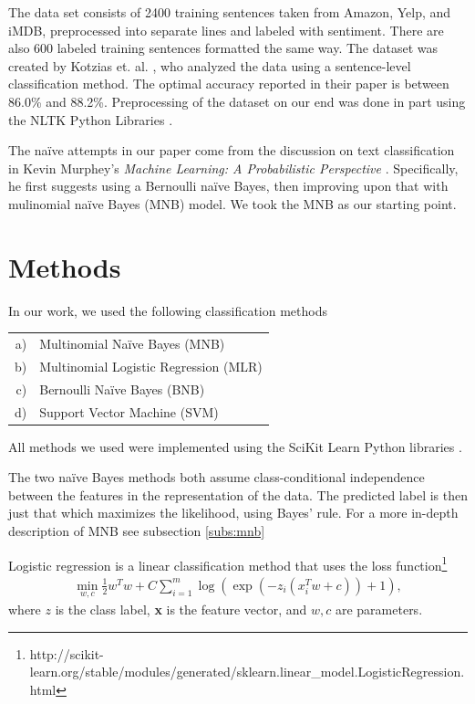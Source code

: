 \documentclass{article} %
\begin{document}
	The data set consists of 2400 training sentences taken from Amazon, Yelp, and iMDB, preprocessed into separate lines and labeled with sentiment. There are also 600 labeled training sentences formatted the same way. The dataset was created by Kotzias et. al. \cite{Kotzias2015}, who analyzed the data using a sentence-level classification method. The optimal accuracy reported in their paper is between 86.0\% and 88.2\%. Preprocessing of the dataset on our end was done in part using the NLTK Python Libraries \cite{nltk}.
	
	The na\"ive attempts in our paper come from the discussion on text classification in Kevin Murphey's \emph{Machine Learning: A Probabilistic Perspective} \cite{Murphy2012}. Specifically, he first suggests using a Bernoulli na\"ive Bayes, then improving upon that with mulinomial na\"ive Bayes (MNB) model. We took the MNB as our starting point. 
	
	
	\section{Methods}
	
	In our work, we used the following classification methods
	
	\begin{tabular}{rl}
		a) & Multinomial Na\"ive Bayes (MNB)\\
		b) & Multinomial Logistic Regression (MLR)\\
		c) & Bernoulli Na\"ive Bayes (BNB) \\
		d) & Support Vector Machine (SVM)
	\end{tabular}

	All methods we used were implemented using the SciKit Learn Python libraries \cite{scikit-learn}. 
	
	The two na\"ive Bayes methods both assume class-conditional independence between the features in the representation of the data. The predicted label is then just that which maximizes the likelihood, using Bayes' rule. For a more in-depth description of MNB see subsection \ref{subs:mnb}
	
	Logistic regression is a linear classification method that uses the loss function\footnote{http://scikit-learn.org/stable/modules/generated/sklearn.linear\_model.LogisticRegression.html}
	\begin{align}
	\min_{w,c}\frac{1}{2}w^Tw + C\sum_{i = 1}^{m}\log\left(\exp\left(-z_i\left(x_i^Tw+c\right)\right)+1\right),
	\end{align}
	where $z$ is the class label, {\bf x} is the feature vector, and $w,c$ are parameters.
	
\end{document}
